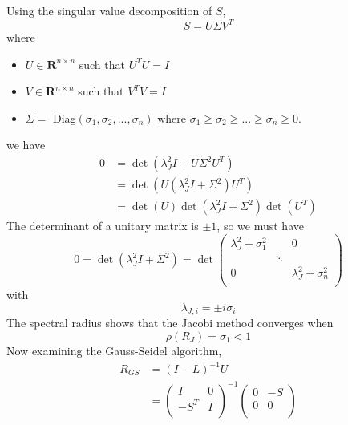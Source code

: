 \documentclass[11pt]{article} %
\begin{document}
Using the singular value decomposition of  $S$,
\begin{equation}
S = U \Sigma V^T
\end{equation}
where
\begin{itemize}
\item $U \in \mathbf{R}^{n\times n}$ such that $U^T U = I$
\item $V \in \mathbf{R}^{n\times n}$ such that $V^T V = I$
\item $\Sigma =$ Diag$(\sigma_1, \sigma_2, ... , \sigma_n)$ where $\sigma_1 \ge \sigma_2 \ge ... \ge \sigma_n \ge 0$. 
\end{itemize}
we have
\begin{equation}
\begin{split}
0&= \det(\lambda_J^2 I + U \Sigma^2 U^T) \\
&= \det(U( \lambda_J^2 I + \Sigma^2 )U^T) \\
& = \det(U) \det(\lambda_J^2 I + \Sigma^2) \det(U^T)
\end{split}
\end{equation}
The determinant of a unitary matrix is $\pm 1$, so we must have
\begin{equation}
0=\det(\lambda_J^2 I + \Sigma^2) = \det \left ( \begin{array}{rrr}
\lambda_J^2 + \sigma_1^2 &&0 \\
& \ddots & \\
0&& \lambda_J^2 + \sigma_n^2 \\
\end{array} \right )
\end{equation}
with
\begin{equation}
\lambda_{J,i} = \pm i \sigma_i
\end{equation}
The spectral radius shows that the Jacobi method converges when
\begin{equation}
\boxed{\rho(R_{J}) =\sigma_1 < 1}
\end{equation}
Now examining the Gauss-Seidel algorithm,
\begin{equation}
\begin{split}
R_{GS}&=(I-L)^{-1} U \\
&= \left ( \begin{array}{rr}
I  &0 \\
-S^T & I \\
\end{array} \right )^{-1}
\left ( \begin{array}{rr}
0 & -S \\
0 & 0 \\
\end{array} \right )
\end{split}
\end{equation}
\end{document}

